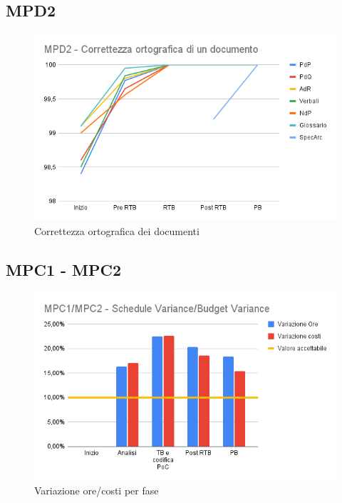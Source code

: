 \subsection{MPD2}
\begin{figure}[h!]
    \centering
    \includegraphics[scale=0.65]{../../assets/MPD2 - Correttezza ortografica di un documento.png}
    \caption{Correttezza ortografica dei documenti}
\end{figure}

\newpage
\subsection{MPC1 - MPC2}
\begin{figure}[h!]
    \centering
    \includegraphics[scale=0.65]{../../assets/MPC1_MPC2 - Schedule Variance_Budget Variance.png}
    \caption{Variazione ore/costi per fase}
\end{figure}
